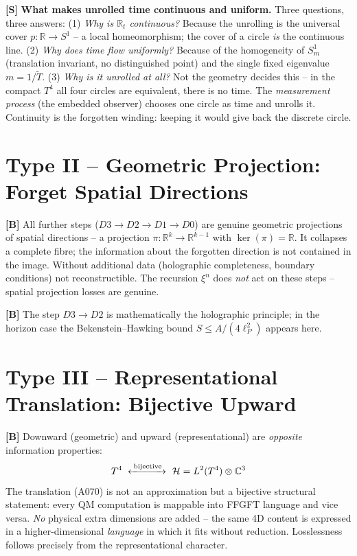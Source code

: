 \textbf{[S]} \textbf{What makes unrolled time continuous and uniform.} Three
questions, three answers: (1) \emph{Why is $\mathbb{R}_t$ continuous?} Because
the unrolling is the universal cover $p:\mathbb{R}\to S^1$ -- a local
homeomorphism; the cover of a circle \emph{is} the continuous line. (2) \emph{Why
does time flow uniformly?} Because of the homogeneity of $S^1_m$ (translation
invariant, no distinguished point) and the single fixed eigenvalue $m=1/\tilde T$.
(3) \emph{Why is it unrolled at all?} Not the geometry decides this -- in the
compact $T^4$ all four circles are equivalent, there is no time. The
\emph{measurement process} (the embedded observer) chooses one circle as time and
unrolls it. Continuity is the forgotten winding: keeping it would give back the
discrete circle.

\section{Type II -- Geometric Projection: Forget Spatial Directions}

\textbf{[B]} All further steps ($D3\to D2\to D1\to D0$) are genuine geometric
projections of spatial directions -- a projection $\pi:\mathbb{R}^k\to\mathbb{R}^{k-1}$
with $\ker(\pi)=\mathbb{R}$. It collapses a complete fibre; the information about
the forgotten direction is not contained in the image. Without additional data
(holographic completeness, boundary conditions) not reconstructible. The recursion
$\xi^n$ does \emph{not} act on these steps -- spatial projection losses are genuine.

\textbf{[B]} The step $D3\to D2$ is mathematically the holographic principle;
in the horizon case the Bekenstein--Hawking bound $S\le A/(4\ell_P^2)$ appears here.

\section{Type III -- Representational Translation: Bijective Upward}

\textbf{[B]} Downward (geometric) and upward (representational) are
\emph{opposite} information properties:
\[
  T^4 \;\xleftrightarrow{\;\text{bijective}\;}\ \mathcal H = L^2(T^4)\otimes\mathbb{C}^3
\]
The translation (A070) is not an approximation but a bijective structural
statement: every QM computation is mappable into FFGFT language and vice versa.
\emph{No} physical extra dimensions are added -- the same 4D content is expressed
in a higher-dimensional \emph{language} in which it fits without reduction.
Losslessness follows precisely from the representational character.

